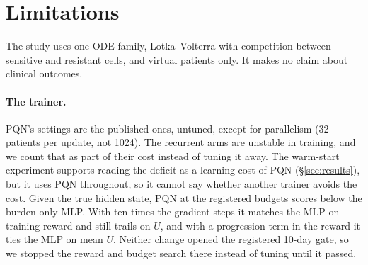 \documentclass[10pt]{article}
\begin{document}
\begin{table}[t]
\centering\footnotesize
\caption{Controls for claims about memory or continuous time in partially
observed RL: what each catches here, and its cost.}
\label{tab:controls}
\end{table}



\section{Limitations}\label{sec:limits}
The study uses one ODE family, Lotka--Volterra with competition between
sensitive and resistant cells, and virtual patients only. It makes no claim
about clinical outcomes.

\paragraph{The trainer.} PQN's settings are the published ones, untuned, except
for parallelism (32 patients per update, not 1024). The recurrent arms are
unstable in training, and we count that as part of their cost instead of tuning
it away. The warm-start experiment supports reading the deficit as a learning
cost of PQN (\S\ref{sec:results}), but it uses PQN throughout, so it cannot say
whether another trainer avoids the cost. Given the true hidden state, PQN at the
registered budgets scores below the burden-only MLP. With ten times the
gradient steps it matches the MLP on training reward and still trails on $U$,
and with a progression term in the reward it ties the MLP on mean $U$. Neither
change opened the registered 10-day gate, so we stopped the reward and budget
search there instead of tuning until it passed.
\end{document}
